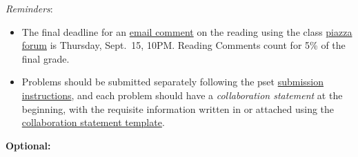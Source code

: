 \documentclass[handout]{mcs}
\begin{document}
\renewcommand{\reading}{Part~\bref{part:proofs}{. \emph{Proofs:
      Introduction}}, Chapter~\bref{proofs_chap}{, \emph{What is a
      Proof?}}; Chapter~\bref{well_ordering_chap}{, \emph{The Well
      Ordering Principle}}; and Chapter~\bref{logicform_chap}{ through
    \bref{SAT_sec}{, covering \emph{Propositional Logic}}}.  These
  assigned readings \textbf{do not include the Problem sections}.  (Many
  of the problems in the text will appear as class or homework problems.)}


  \emph{Reminders}:
\begin{itemize}

\item The final deadline for an
  \href{http://courses.csail.mit.edu/6.042/fall11/courseinfo#comments}{email
    comment} on the reading using the class
  \href{http://www.piazza.com/mit/fall2011/6042j18062j}{piazza forum}
  is Thursday, Sept.\ 15, 10PM.  Reading Comments count for 5\% of the
  final grade.

\item Problems should be submitted separately following the pset
  \href{http://courses.csail.mit.edu/6.042/fall11/submission}{submission
    instructions}, and each problem should have a \emph{collaboration
    statement} at the beginning, with the requisite information
  written in or attached using the
  \href{http://courses.csail.mit.edu/6.042/fall11/submission_template.pdf}{collaboration
    statement template}.

 \end{itemize}







\begin{center}
\large \textbf{Optional:}
\end{center}


\end{document}
